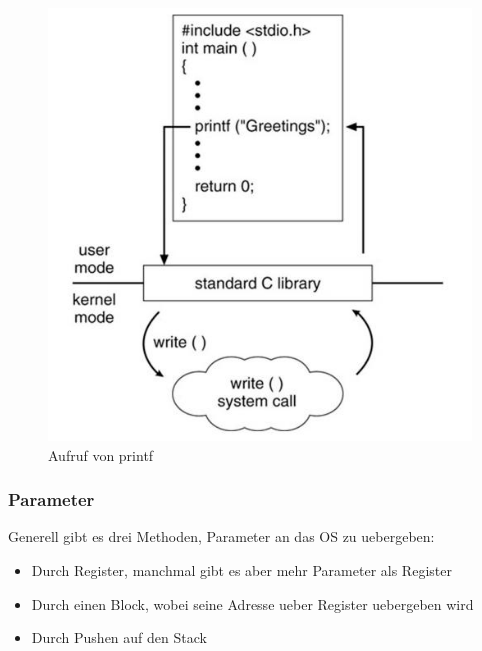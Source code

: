 \documentclass[a4paper]{scrreprt}
\begin{document}
\begin{figure}[ht]
\centering
\includegraphics[scale=0.4]{printf.png}
\caption{Aufruf von printf}
\end{figure}

\subsubsection{Parameter}
Generell gibt es drei Methoden, Parameter an das OS zu uebergeben:
\begin{itemize}
	\item Durch Register, manchmal gibt es aber mehr Parameter als Register
	\item Durch einen Block, wobei seine Adresse ueber Register uebergeben wird
	\item Durch Pushen auf den Stack
\end{itemize}
\end{document}
